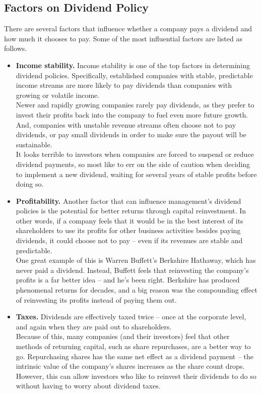 \subsection{Factors on Dividend Policy}
There are several factors that influence whether a company pays a dividend and how much it chooses to pay. Some of the most influential factors are listed as follows.
\begin{itemize}
	\item \textbf{Income stability.} 
	Income stability is one of the top factors in determining dividend policies. Specifically, established companies with stable, predictable income streams are more likely to pay dividends than companies with growing or volatile income.\\
	Newer and rapidly growing companies rarely pay dividends, as they prefer to invest their profits back into the company to fuel even more future growth. And, companies with unstable revenue streams often choose not to pay dividends, or pay small dividends in order to make sure the payout will be sustainable.\\
	It looks terrible to investors when companies are forced to suspend or reduce dividend payments, so most like to err on the side of caution when deciding to implement a new dividend, waiting for several years of stable profits before doing so.	
	
	\item  \textbf{Profitability.}
	Another factor that can influence management's dividend policies is the potential for better returns through capital reinvestment. In other words, if a company feels that it would be in the best interest of its shareholders to use its profits for other business activities besides paying dividends, it could choose not to pay – even if its revenues are stable and predictable.\\
	One great example of this is Warren Buffett's Berkshire Hathaway, which has never paid a dividend. Instead, Buffett feels that reinvesting the company's profits is a far better idea -- and he's been right. Berkshire has produced phenomenal returns for decades, and a big reason was the compounding effect of reinvesting its profits instead of paying them out.
	
	\item \textbf{Taxes.}
	Dividends are effectively taxed twice -- once at the corporate level, and again when they are paid out to shareholders.\\
	Because of this, many companies (and their investors) feel that other methods of returning capital, such as share repurchases, are a better way to go. Repurchasing shares has the same net effect as a dividend payment -- the intrinsic value of the company's shares increases as the share count drops. However, this can allow investors who like to reinvest their dividends to do so without having to worry about dividend taxes.
	

\end{itemize}
